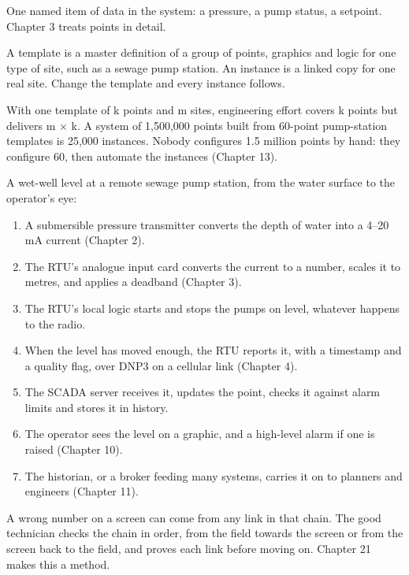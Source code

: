  One named item of data in the system: a pressure, a pump status, a setpoint. Chapter 3 treats points in detail.

 A template is a master definition of a group of points, graphics and logic for one type of site, such as a sewage pump station. An instance is a linked copy for one real site. Change the template and every instance follows.

 With one template of k points and m sites, engineering effort covers k points but delivers m × k. A system of 1,500,000 points built from 60-point pump-station templates is 25,000 instances. Nobody configures 1.5 million points by hand: they configure 60, then automate the instances (Chapter 13).

A wet-well level at a remote sewage pump station, from the water surface to the operator's eye:
\begin{enumerate}
\item A submersible pressure transmitter converts the depth of water into a 4–20 mA current (Chapter 2).
\item The RTU's analogue input card converts the current to a number, scales it to metres, and applies a deadband (Chapter 3).
\item The RTU's local logic starts and stops the pumps on level, whatever happens to the radio.
\item When the level has moved enough, the RTU reports it, with a timestamp and a quality flag, over DNP3 on a cellular link (Chapter 4).
\item The SCADA server receives it, updates the point, checks it against alarm limits and stores it in history.
\item The operator sees the level on a graphic, and a high-level alarm if one is raised (Chapter 10).
\item The historian, or a broker feeding many systems, carries it on to planners and engineers (Chapter 11).
\end{enumerate}
 A wrong number on a screen can come from any link in that chain. The good technician checks the chain in order, from the field towards the screen or from the screen back to the field, and proves each link before moving on. Chapter 21 makes this a method.

